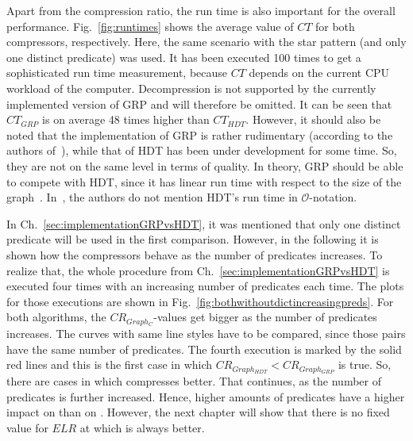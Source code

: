 Apart from the compression ratio, the run time is also important for the overall performance. Fig.~\ref{fig:runtimes} shows the average value of $CT$ for both compressors, respectively. Here, the same scenario with the star pattern (and only one distinct predicate) was used. It has been executed 100 times to get a sophisticated run time measurement, because $CT$ depends on the current CPU workload of the computer. Decompression is not supported by the currently implemented version of GRP and will therefore be omitted. It can be seen that $CT_{GRP}$ is on average 48 times higher than $CT_{HDT}$. However, it should also be noted that the implementation of GRP is rather rudimentary  (according to the authors of~\cite{maneth}), while that of HDT has been under development for some time. So, they are not on the same level in terms of quality. In theory, GRP should be able to compete with HDT, since it has linear run time with respect to the size of the graph~\cite{maneth}. In~\cite{hdt}, the authors do not mention HDT's run time in $\mathcal{O}$-notation.
\FloatBarrier

In Ch.~\ref{sec:implementationGRPvsHDT}, it was mentioned that only one distinct predicate will be used in the first comparison. However, in the following it is shown how the compressors behave as the number of predicates increases. To realize that, the whole procedure from Ch.~\ref{sec:implementationGRPvsHDT} is executed  four times with an increasing number of predicates each time. The plots for those executions are shown in Fig.~\ref{fig:bothwithoutdictincreasingpreds}. For both algorithms, the $CR_{Graph_C}$-values get bigger as the number of predicates increases. The curves with same line styles have to be compared, since those pairs have the same number of predicates. The fourth execution is marked by the solid red lines and this is the first case in which $CR_{Graph_{HDT}} <CR_{Graph_{GRP}} $ is true. So, there are cases in which \GHDT{} compresses better. That continues, as the number of predicates is further increased. Hence, higher amounts of predicates have a higher impact on \GGRP{} than on \GHDT{}. However, the next chapter will show that there is no fixed value for $ELR$ at which \GHDT{} is always better.

